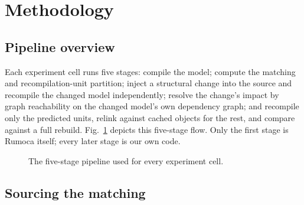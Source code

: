 \documentclass[journal]{IEEEtran}
\begin{document}
\section{Methodology}
\label{sec:method}

\subsection{Pipeline overview}

Each experiment cell runs five stages: compile the model; compute the matching and recompilation-unit partition; inject a structural change into the source and recompile the changed model independently; resolve the change's impact by graph reachability on the changed model's own dependency graph; and recompile only the predicted units, relink against cached objects for the rest, and compare against a full rebuild. Fig.~\ref{fig:pipeline} depicts this five-stage flow. Only the first stage is Rumoca itself; every later stage is our own code.

\begin{figure}[!t]
\centering
{}
\caption{The five-stage pipeline used for every experiment cell.}
\label{fig:pipeline}
\end{figure}

\subsection{Sourcing the matching}
\end{document}
